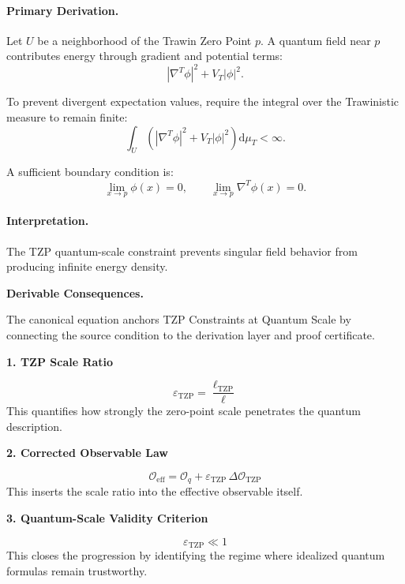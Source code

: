 \paragraph{Primary Derivation.}
Let $U$ be a neighborhood of the Trawin Zero Point $p$.  
A quantum field near $p$ contributes energy through gradient and potential terms:
\begin{equation}
|\nabla^T\phi|^2
+
V_T|\phi|^2 .
\end{equation}

To prevent divergent expectation values, require the integral over the Trawinistic measure to remain finite:
\begin{equation}
\int_U
\left(
|\nabla^T\phi|^2
+
V_T|\phi|^2
\right)
\mathrm{d}\mu_T
<\infty .
\end{equation}

A sufficient boundary condition is:
\begin{equation}
\boxed{
\lim_{x\to p}\phi(x)=0,
\qquad
\lim_{x\to p}\nabla^T\phi(x)=0 .
}
\end{equation}

\paragraph{Interpretation.}
The TZP quantum-scale constraint prevents singular field behavior from producing infinite energy density.

\par\vspace{0.35em}
\noindent\textbf{Derivable Consequences.}\quad
\begingroup
\footnotesize
\raggedright
The canonical equation anchors TZP Constraints at Quantum Scale by connecting the source condition to the derivation layer and proof certificate.
\par\endgroup

\noindent\textbf{1. TZP Scale Ratio}\par
\[
\varepsilon_{\mathrm{TZP}} = \frac{\ell_{\mathrm{TZP}}}{\ell}
\]
\noindent This quantifies how strongly the zero-point scale penetrates the quantum description.\par
\noindent\textbf{2. Corrected Observable Law}\par
\[
\mathcal{O}_{\mathrm{eff}}
=
\mathcal{O}_{q} + \varepsilon_{\mathrm{TZP}}\,\Delta\mathcal{O}_{\mathrm{TZP}}
\]
\noindent This inserts the scale ratio into the effective observable itself.\par
\noindent\textbf{3. Quantum-Scale Validity Criterion}\par
\[
\varepsilon_{\mathrm{TZP}} \ll 1
\]
\noindent This closes the progression by identifying the regime where idealized quantum formulas remain trustworthy.\par

